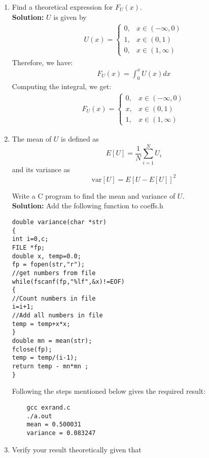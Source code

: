 \documentclass[journal,12pt,twocolumn]{IEEEtran}
\newcommand{\solution}{\noindent \textbf{Solution: }}
\providecommand{\sbrak}[1]{\ensuremath{\left[#1\right]}}
\numberwithin{equation}{section}
\renewcommand\thesection{\arabic{section}}
\begin{document}
\begin{enumerate}[label=\thesection.\arabic*,ref=\thesection.\theenumi]
	\item
Find a  theoretical expression for $F_{U}(x)$.
\\
\solution
$U$ is given by 
\begin{align}
    U(x) = 
    \begin{cases}
        0, & x \in (-\infty,0) \\
        1, & x \in (0,1) \\
        0, & x \in (1, \infty)
    \end{cases}
\end{align}
Therefore, we have:
    \begin{align}
        F_U(x) = \int_0^x U(x) dx
    \end{align}
Computing the integral, we get:
\begin{align}
    F_U(x) = 
    \begin{cases}
        0, & x \in (-\infty,0) \\
        x, & x \in (0,1) \\
        1, & x \in (1, \infty)
    \end{cases}
\end{align}

\item
The mean of $U$ is defined as
%
\begin{equation}
E\sbrak{U} = \frac{1}{N}\sum_{i=1}^{N}U_i
\end{equation}
%
and its variance as
%
\begin{equation}
\text{var}\sbrak{U} = E\sbrak{U- E\sbrak{U}}^2 
\end{equation}

Write a C program to  find the mean and variance of $U$.
\\
\solution
Add the following function to coeffs.h
\begin{lstlisting}
double variance(char *str)
{
int i=0,c;
FILE *fp;
double x, temp=0.0;
fp = fopen(str,"r");
//get numbers from file
while(fscanf(fp,"%lf",&x)!=EOF)
{
//Count numbers in file
i=i+1;
//Add all numbers in file
temp = temp+x*x;
}
double mn = mean(str);
fclose(fp);
temp = temp/(i-1);
return temp - mn*mn ;
}
    \end{lstlisting}
Following the steps mentioned below gives the required result:
\begin{lstlisting}
    gcc exrand.c
    ./a.out
    mean = 0.500031
    variance = 0.083247
\end{lstlisting}


\item Verify your result theoretically given that
\end{enumerate}
\end{document}
